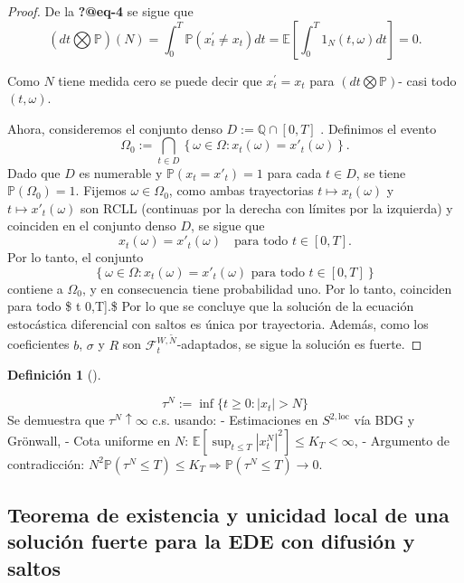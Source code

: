 \documentclass[
  spanish,
  us-letterpaper,
]{scrreprt}
\theoremstyle{plain}
\theoremstyle{plain}
\theoremstyle{definition}
\newtheorem{definition}{Definición}[chapter]
\theoremstyle{remark}
\begin{document}
\begin{proof}
De la \textbf{?@eq-4} se sigue que
\[(dt\bigotimes\mathbb{P})(N) = \int_0^T \mathbb{P}(x^{\prime}_t\neq x_t)dt = \mathbb{E} \left[\int_0^T 1_N(t,\omega)dt\right]= 0.\]

Como \(N\) tiene medida cero se puede decir que \(x^\prime_t = x_t\)
para \((dt\bigotimes\mathbb{P})\)- casi todo \((t,\omega)\).

Ahora, consideremos el conjunto denso \(D:=\mathbb{Q}\cap[0,T]\) .
Definimos el evento
\[\Omega_0 := \bigcap_{t \in D} \left\{ \omega \in \Omega : x_t(\omega) = x'_t(\omega) \right\}.\]
Dado que \(D\) es numerable y \(\mathbb{P}(x_t = x'_t) = 1\) para cada
\(t \in D\), se tiene \(\mathbb{P}(\Omega_0) = 1\). Fijemos
\(\omega \in \Omega_0\), como ambas trayectorias
\(t \mapsto x_t(\omega)\) y \(t \mapsto x'_t(\omega)\) son RCLL
(continuas por la derecha con límites por la izquierda) y coinciden en
el conjunto denso \(D\), se sigue que
\[x_t(\omega) = x'_t(\omega) \quad \text{para todo } t \in [0,T].\] Por
lo tanto, el conjunto
\[\left\{ \omega \in \Omega : x_t(\omega) = x'_t(\omega) \text{ para todo } t \in [0,T] \right\}\]
contiene a \(\Omega_0\), y en consecuencia tiene probabilidad uno. Por
lo tanto, coinciden para todo \$ t \in {[}0,T{]}.\$ Por lo que se
concluye que la solución de la ecuación estocástica diferencial con
saltos es única por trayectoria. Además, como los coeficientes \(b\),
\(\sigma\) y \(R\) son \(\mathcal{F}_t^{W,\widetilde{N}}\)-adaptados, se
sigue la solución es fuerte.
\end{proof}

\begin{definition}[]\protect\hypertarget{def-Tiempos_paro_explosión}{}\label{def-Tiempos_paro_explosión}

\[\tau^N := \inf\{ t \geq 0 : |x_t| > N \}\] Se demuestra que
\(\tau^N \uparrow \infty\) c.s. usando: - Estimaciones en
\(S^{2,\mathrm{loc}}\) vía BDG y Grönwall, - Cota uniforme en \(N\):
\(\mathbb{E}[\sup_{t \leq T} |x_t^N|^2] \leq K_T < \infty\), - Argumento
de contradicción:
\(N^2 \mathbb{P}(\tau^N \leq T) \leq K_T \Rightarrow \mathbb{P}(\tau^N \leq T) \to 0\).

\end{definition}

\subsection{Teorema de existencia y unicidad local de una solución
fuerte para la EDE con difusión y
saltos}\label{teorema-de-existencia-y-unicidad-local-de-una-soluciuxf3n-fuerte-para-la-ede-con-difusiuxf3n-y-saltos}
\end{document}

